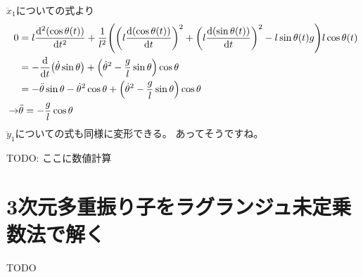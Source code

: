 \documentclass[uplatex]{jsarticle}
\begin{document}
$\ddot{x}_1$についての式より
\begin{align}
    0 &= l\dv[2]{\qty(\cos\theta(t))}{t}
        + \frac{1}{l^2} \qty(
            \qty(l\dv{\qty(\cos\theta(t))}{t})^2 + \qty(l\dv{\qty(\sin\theta(t))}{t})^2
            - l\sin{\theta(t)} g
        ) l\cos{\theta(t)} \nonumber \\
    &= -\dv{}{t}\qty(\dot{\theta}\sin\theta) + \qty(\dot{\theta}^2 - \frac{g}{l}\sin\theta) \cos\theta \nonumber \\
    &= -\ddot{\theta}\sin\theta - \dot{\theta}^2\cos\theta + \qty(\dot{\theta}^2 - \frac{g}{l}\sin\theta) \cos\theta \nonumber \\
    \rightarrow&
    \ddot{\theta} = -\frac{g}{l}\cos\theta
\end{align}
$\ddot{y}_1$についての式も同様に変形できる。
あってそうですね。

TODO: ここに数値計算

\section{3次元多重振り子をラグランジュ未定乗数法で解く}

TODO



\end{document}
